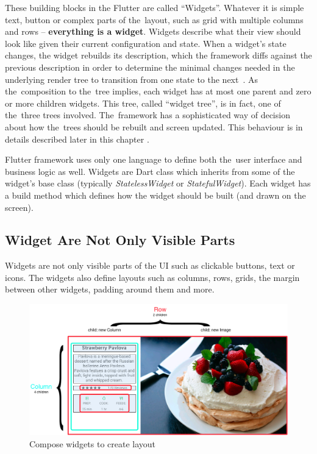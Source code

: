 These building blocks in the Flutter are called ``Widgets''. Whatever it is simple text, button or complex parts of the~layout, such as grid with multiple columns and rows -- \textbf{everything is a widget}.  Widgets describe what their view should look like given their current configuration and state. When a widget's state changes, the widget rebuilds its description, which the framework diffs against the previous description in order to determine the minimal changes needed in the underlying render tree to transition from one state to the next~\cite{flutter-widget-intro}. As the~composition to the~tree implies, each widget has at most one parent and zero or more children widgets. This tree, called ``widget tree'', is in fact, one of the~three trees involved. The~framework has a sophisticated way of decision about how the~trees should be rebuilt and screen updated. This behaviour is in details described later in this chapter .

Flutter framework uses only one language to define both the~user interface and business logic as well.  Widgets are Dart class which inherits from some of the widget's base class (typically \textit{StatelessWidget} or \textit{StatefulWidget}). Each widget has a build method which defines how the widget should be built (and drawn on the screen). 
\subsection{Widget Are Not Only Visible Parts}
Widgets are not only visible parts of the UI such as clickable buttons, text or icons. The widgets also define layouts such as columns, rows, grids, the margin between other widgets, padding around them and more. 

\begin{figure}[htp]
    \centering
    \includegraphics[width=0.75\linewidth]{img/flutter/layout_compose.png}
    \caption{Compose widgets to create layout~\cite{flutter-widget-layout}}
    \label{fig:flutter-compose-widget}
\end{figure}

